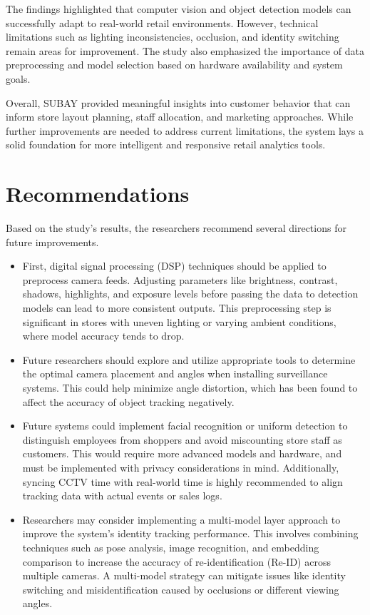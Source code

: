 {The findings highlighted that computer vision and object detection models can successfully adapt to real-world retail environments. However, technical limitations such as lighting inconsistencies, occlusion, and identity switching remain areas for improvement. The study also emphasized the importance of data preprocessing and model selection based on hardware availability and system goals.

Overall, SUBAY provided meaningful insights into customer behavior that can inform store layout planning, staff allocation, and marketing approaches. While further improvements are needed to address current limitations, the system lays a solid foundation for more intelligent and responsive retail analytics tools.

\section{Recommendations}

Based on the study's results, the researchers recommend several directions for future improvements.
\begin{itemize}
	\item First, digital signal processing (DSP) techniques should be applied to preprocess camera feeds. Adjusting parameters like brightness, contrast, shadows, highlights, and exposure levels before passing the data to detection models can lead to more consistent outputs. This preprocessing step is significant in stores with uneven lighting or varying ambient conditions, where model accuracy tends to drop.
	
	\item Future researchers should explore and utilize appropriate tools to determine the optimal camera placement and angles when installing surveillance systems. This could help minimize angle distortion, which has been found to affect the accuracy of object tracking negatively.
	
	\item Future systems could implement facial recognition or uniform detection to distinguish employees from shoppers and avoid miscounting store staff as customers. This would require more advanced models and hardware, and must be implemented with privacy considerations in mind. Additionally, syncing CCTV time with real-world time is highly recommended to align tracking data with actual events or sales logs.
	
	\item Researchers may consider implementing a multi-model layer approach to improve the system's identity tracking performance. This involves combining techniques such as pose analysis, image recognition, and embedding comparison to increase the accuracy of re-identification (Re-ID) across multiple cameras. A multi-model strategy can mitigate issues like identity switching and misidentification caused by occlusions or different viewing angles.
	

\end{itemize}}
